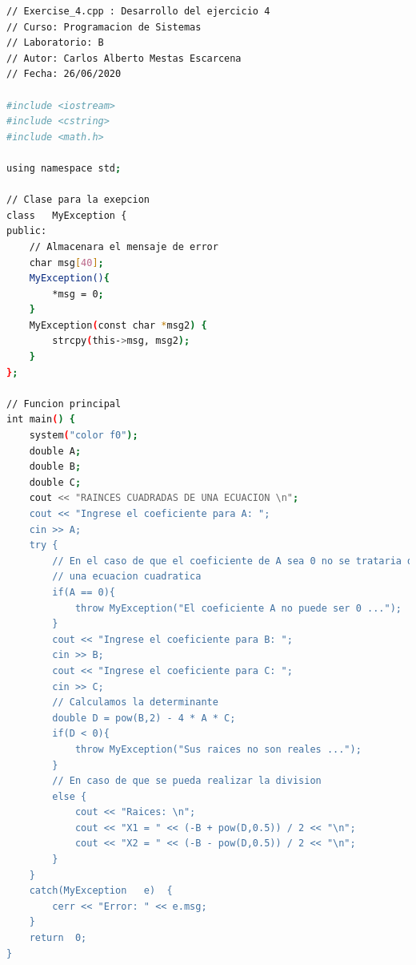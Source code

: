 \documentclass[12pt]{article}
\begin{document}
\begin{lstlisting}[language=bash,frame=single,style=CStyle]
// Exercise_4.cpp : Desarrollo del ejercicio 4
// Curso: Programacion de Sistemas
// Laboratorio: B
// Autor: Carlos Alberto Mestas Escarcena
// Fecha: 26/06/2020

#include <iostream>
#include <cstring>	
#include <math.h>

using namespace std;

// Clase para la exepcion
class	MyException	{
public:
	// Almacenara el mensaje de error
	char msg[40];
	MyException(){
		*msg = 0;	
	}
	MyException(const char *msg2) {
		strcpy(this->msg, msg2);
	}
};

// Funcion principal
int	main() {
	system("color f0");
	double A;
	double B;
	double C;
	cout << "RAINCES CUADRADAS DE UNA ECUACION \n";
	cout << "Ingrese el coeficiente para A: ";
	cin >> A;
	try	{
		// En el caso de que el coeficiente de A sea 0 no se trataria de
		// una ecuacion cuadratica
		if(A == 0){
			throw MyException("El coeficiente A no puede ser 0 ...");
		}
		cout << "Ingrese el coeficiente para B: ";
		cin >> B;
		cout << "Ingrese el coeficiente para C: ";
		cin >> C;
		// Calculamos la determinante
		double D = pow(B,2) - 4 * A * C;
		if(D < 0){
			throw MyException("Sus raices no son reales ...");
		}
		// En caso de que se pueda realizar la division
		else {
			cout << "Raices: \n";
			cout << "X1 = " << (-B + pow(D,0.5)) / 2 << "\n";
			cout << "X2 = " << (-B - pow(D,0.5)) / 2 << "\n";
		}
	}
	catch(MyException	e)	{
		cerr <<	"Error:	" << e.msg;
	}
	return	0;
}
\end{lstlisting}
\end{document}
